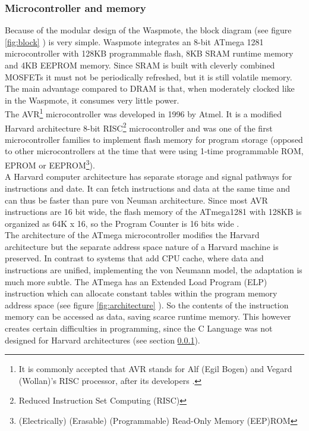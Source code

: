 \subsubsection{Microcontroller and memory}
\label{memory}
Because of the modular design of the Waspmote, the block diagram (see figure \ref{fig:block} \label{fig13}) is very simple. Waspmote integrates an 8-bit ATmega 1281 microcontroller with 128KB programmable flash, 8KB SRAM runtime memory and 4KB EEPROM memory. Since SRAM is built with cleverly combined MOSFETs it must not be periodically refreshed, but it is still volatile memory. The main advantage compared to DRAM is that, when moderately clocked like in the Waspmote, it consumes very little power.\\
The AVR\footnote{It is commonly accepted that AVR stands for Alf (Egil Bogen) and Vegard (Wollan)'s RISC processor, after its developers \citep{AVRWIKI}.} microcontroller was developed in 1996 by Atmel. It is a modified Harvard architecture 8-bit RISC\footnote{Reduced Instruction Set Computing (RISC)} microcontroller and was one of the first microcontroller families to implement flash memory for program storage (opposed to other microcontrollers at the time that were using 1-time programmable ROM, EPROM or EEPROM\footnote{(Electrically) (Erasable) (Programmable) Read-Only Memory (EEP)ROM}).\\
A Harvard computer architecture has separate storage and signal pathways for instructions and date. It can fetch instructions and data at the same time and can thus be faster than pure von Neuman architecture. Since most AVR instructions are 16 bit wide, the flash memory of the ATmega1281 with 128KB is organized as 64K x 16, so the Program Counter is 16 bits wide .\\
The architecture of the ATmega microcontroller modifies the Harvard architecture but the separate address space nature of a Harvard machine is preserved. In contrast to systems that add CPU cache, where data and instructions are unified, implementing the von Neumann model, the adaptation is much more subtle. The ATmega has an Extended Load Program (ELP) instruction which can allocate constant tables within the program memory address space (see figure \ref{fig:architecture} \label{fig14}). So the contents of the instruction memory can be accessed as data, saving scarce runtime memory. This however creates certain difficulties in programming, since the C Language was not designed for Harvard architectures (see section \ref{memory}). 
